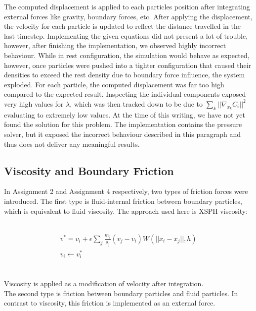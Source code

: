 \documentclass{ACGSeminar}
\begin{document}
The computed displacement is applied to each particles position after integrating external forces like gravity, boundary forces, etc.
After applying the displacement, the velocity for each particle is updated to reflect the distance travelled in the last timestep.
Implementing the given equations did not present a lot of trouble, however, after finishing the implementation, we observed highly incorrect behaviour. While in rest configuration, the simulation would behave as expected, however, once particles were pushed into a tighter configuration that caused their densities to exceed the rest density due to boundary force influence, the system exploded. For each particle, the computed displacement was far too high compared to the expected result.
Inspecting the individual components exposed very high values for \(\lambda\), which was then tracked down to be due to \(\sum_{k}||\nabla_{x_{k}}C_{i}||^2\) evaluating to extremely low values. At the time of this writing, we have not yet found the solution for this problem. The implementation contains the pressure solver, but it exposed the incorrect behaviour described in this paragraph and thus does not deliver any meaningful results.\\

\subsection{Viscosity and Boundary Friction}

In Assignment 2 and Assignment 4 respectively, two types of friction forces were introduced. 
The first type is fluid-internal friction between boundary particles, which is equivalent to fluid viscosity. The approach used here is XSPH viscosity:

\\
\begin{equation}
\begin{aligned}
v^* = v_i + \epsilon \sum_j \frac{m_j}{\rho_j}(v_j - v_i)W(||x_i - x_j||, h)\\
v_i \leftarrow v^*_i
\end{aligned}
\end{equation}\\
\\

Viscosity is applied as a modification of velocity after integration.\\
The second type is friction between boundary particles and fluid particles. In contrast to viscosity, this friction is implemented as an external force.
\end{document}
